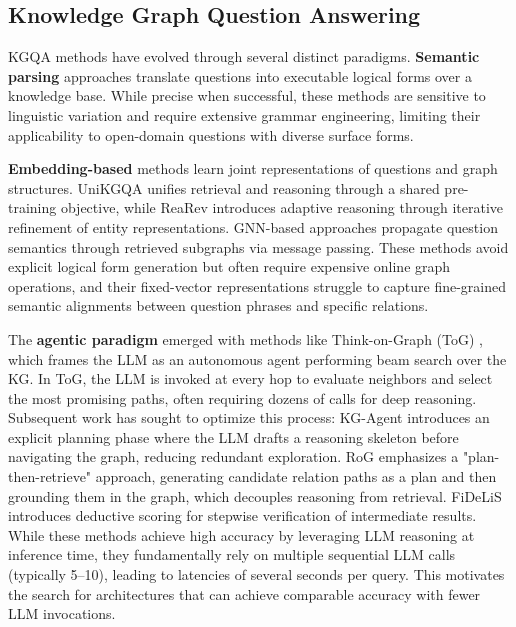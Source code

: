 \documentclass[conference]{IEEEtran}
\begin{document}
\subsection{Knowledge Graph Question Answering}

KGQA methods have evolved through several distinct paradigms. \textbf{Semantic parsing} approaches \cite{yih2016webqsp, yu2018spider, lei2024spider2} translate questions into executable logical forms over a knowledge base. While precise when successful, these methods are sensitive to linguistic variation and require extensive grammar engineering, limiting their applicability to open-domain questions with diverse surface forms.

\textbf{Embedding-based} methods learn joint representations of questions and graph structures. UniKGQA \cite{jiang2023unikgqa} unifies retrieval and reasoning through a shared pre-training objective, while ReaRev \cite{luo2022rearev} introduces adaptive reasoning through iterative refinement of entity representations. GNN-based approaches \cite{yasunaga2021qagnn} propagate question semantics through retrieved subgraphs via message passing. These methods avoid explicit logical form generation but often require expensive online graph operations, and their fixed-vector representations struggle to capture fine-grained semantic alignments between question phrases and specific relations.

The \textbf{agentic paradigm} emerged with methods like Think-on-Graph (ToG) \cite{sun2024tog}, which frames the LLM as an autonomous agent performing beam search over the KG. In ToG, the LLM is invoked at every hop to evaluate neighbors and select the most promising paths, often requiring dozens of calls for deep reasoning. Subsequent work has sought to optimize this process: KG-Agent \cite{jiang2024kgagent} introduces an explicit planning phase where the LLM drafts a reasoning skeleton before navigating the graph, reducing redundant exploration. RoG \cite{luo2024rog} emphasizes a "plan-then-retrieve" approach, generating candidate relation paths as a plan and then grounding them in the graph, which decouples reasoning from retrieval. FiDeLiS \cite{sui2025fidelis} introduces deductive scoring for stepwise verification of intermediate results. While these methods achieve high accuracy by leveraging LLM reasoning at inference time, they fundamentally rely on multiple sequential LLM calls (typically 5--10), leading to latencies of several seconds per query. This motivates the search for architectures that can achieve comparable accuracy with fewer LLM invocations.
\end{document}
